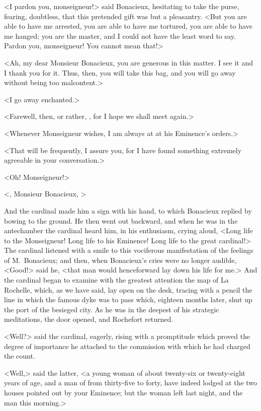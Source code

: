 <I pardon you, monseigneur!> said Bonacieux, hesitating to take the purse, fearing, doubtless, that this pretended gift was but a pleasantry. <But you are able to have me arrested, you are able to have me tortured, you are able to have me hanged; you are the master, and I could not have the least word to say. Pardon you, monseigneur! You cannot mean that!> 

<Ah, my dear Monsieur Bonacieux, you are generous in this matter. I see it and I thank you for it. Thus, then, you will take this bag, and you will go away without being too malcontent.> 

<I go away enchanted.> 

<Farewell, then, or rather, , for I hope we shall meet again.> 

<Whenever Monseigneur wishes, I am always at at his Eminence's orders.> 

<That will be frequently, I assure you, for I have found something extremely agreeable in your conversation.> 

<Oh! Monseigneur!> 

<, Monsieur Bonacieux, > 

And the cardinal made him a sign with his hand, to which Bonacieux replied by bowing to the ground. He then went out backward, and when he was in the antechamber the cardinal heard him, in his enthusiasm, crying aloud, <Long life to the Monseigneur! Long life to his Eminence! Long life to the great cardinal!> The cardinal listened with a smile to this vociferous manifestation of the feelings of M.~Bonacieux; and then, when Bonacieux's cries were no longer audible, <Good!> said he, <that man would henceforward lay down his life for me.> And the cardinal began to examine with the greatest attention the map of La Rochelle, which, as we have said, lay open on the desk, tracing with a pencil the line in which the famous dyke was to pass which, eighteen months later, shut up the port of the besieged city. As he was in the deepest of his strategic meditations, the door opened, and Rochefort returned. 

<Well?> said the cardinal, eagerly, rising with a promptitude which proved the degree of importance he attached to the commission with which he had charged the count. 

<Well,> said the latter, <a young woman of about twenty-six or twenty-eight years of age, and a man of from thirty-five to forty, have indeed lodged at the two houses pointed out by your Eminence; but the woman left last night, and the man this morning.> 

